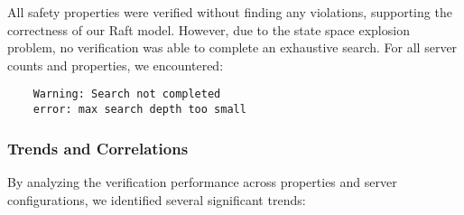 \begin{table}[!htbp]
\centering
\caption{Crash and Recovery Properties Verification Results}
\label{tab:crash-recovery}
\end{table}

All safety properties were verified without finding any violations, supporting the correctness of our Raft model. However, due to the state space explosion problem, no verification was able to complete an exhaustive search. For all server counts and properties, we encountered:
\small{
\begin{verbatim}
    Warning: Search not completed
    error: max search depth too small
\end{verbatim}
}

\subsubsection{Trends and Correlations}
\label{sec:trends}

By analyzing the verification performance across properties and server configurations, we identified several significant trends:

